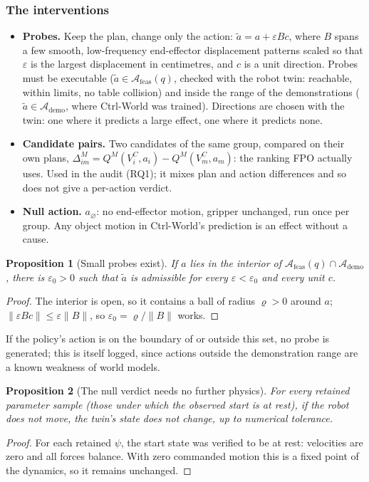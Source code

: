 \documentclass[11pt,a4paper]{article}
\theoremstyle{plain}
\newtheorem{proposition}{Proposition}
\theoremstyle{definition}
\theoremstyle{remark}
\newcommand{\VC}{V^{C}}
\begin{document}
\subsubsection{The interventions}
\begin{itemize}
\item \textbf{Probes.} Keep the plan, change only the action: $\tilde a=a+\varepsilon Bc$, where $B$ spans a few smooth, low-frequency end-effector displacement patterns scaled so that $\varepsilon$ is the largest displacement in centimetres, and $c$ is a unit direction. Probes must be executable ($\tilde a\in\mathcal A_{\mathrm{feas}}(q)$, checked with the robot twin: reachable, within limits, no table collision) and inside the range of the demonstrations ($\tilde a\in\mathcal A_{\mathrm{demo}}$, where Ctrl-World was trained). Directions are chosen with the twin: one where it predicts a large effect, one where it predicts none.
\item \textbf{Candidate pairs.} Two candidates of the same group, compared on their own plans, $\Delta^M_{im}=Q^M(\VC_i,a_i)-Q^M(\VC_m,a_m)$: the ranking FPO actually uses. Used in the audit (RQ1); it mixes plan and action differences and so does not give a per-action verdict.
\item \textbf{Null action.} $a_\varnothing$: no end-effector motion, gripper unchanged, run once per group. Any object motion in Ctrl-World's prediction is an effect without a cause.
\end{itemize}
\begin{proposition}[Small probes exist]\label{prop:probe}
If $a$ lies in the interior of $\mathcal A_{\mathrm{feas}}(q)\cap\mathcal A_{\mathrm{demo}}$, there is $\varepsilon_0>0$ such that $\tilde a$ is admissible for every $\varepsilon<\varepsilon_0$ and every unit $c$.
\end{proposition}
\begin{proof}
The interior is open, so it contains a ball of radius $\varrho>0$ around $a$; $\lVert\varepsilon Bc\rVert\le\varepsilon\lVert B\rVert$, so $\varepsilon_0=\varrho/\lVert B\rVert$ works.
\end{proof}
If the policy's action is on the boundary of or outside this set, no probe is generated; this is itself logged, since actions outside the demonstration range are a known weakness of world models.

\begin{proposition}[The null verdict needs no further physics]\label{prop:null}
For every retained parameter sample (those under which the observed start is at rest), if the robot does not move, the twin's state does not change, up to numerical tolerance.
\end{proposition}
\begin{proof}
For each retained $\psi$, the start state was verified to be at rest: velocities are zero and all forces balance. With zero commanded motion this is a fixed point of the dynamics, so it remains unchanged.
\end{proof}
\end{document}
